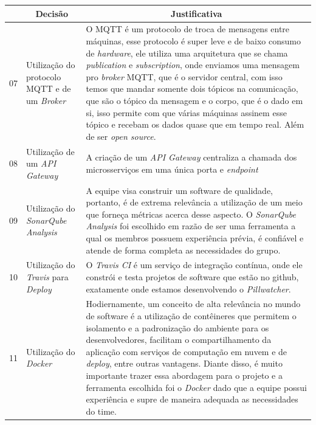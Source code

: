 \begin{apendicesenv}
\begin{table}[H]
    \centering
    \begin{adjustbox}{max width = \textwidth}
        \begin{tabular}{|c|p{5cm}|p{10cm}|}
            \hline
            \rowcolor[HTML]{A8DADC}
            \multicolumn{1}{|c}{\textbf{\#}} &
            \multicolumn{1}{|c}{\textbf{Decisão}} & \multicolumn{1}{|c|}{\textbf{Justificativa}} \\ 
            \hline
            07 & Utilização do protocolo MQTT e de um \textit{Broker} & O MQTT é um protocolo de troca de mensagens entre máquinas, esse protocolo é super leve e de baixo consumo de \textit{hardware}, ele utiliza uma arquitetura que se chama \textit{publication} e \textit{subscription}, onde enviamos uma mensagem pro \textit{broker} MQTT, que é o servidor central, com isso temos que mandar somente dois tópicos na comunicação, que são o tópico da mensagem e o corpo, que é o dado em si, isso permite com que várias máquinas assinem esse tópico e recebam os dados quase que em tempo real. Além de ser \textit{open source}. \\ \hline
            08 & Utilização de um \textit{API Gateway} & A criação de um \emph{API Gateway} centraliza a chamada dos microsserviços em uma única porta e \emph{endpoint}\\ 
            \hline
             09 & Utilização do \textit{SonarQube Analysis} & A equipe visa construir um software de qualidade, portanto, é de extrema relevância a utilização de um meio que forneça métricas acerca desse aspecto. O \textit{SonarQube Analysis} foi escolhido em razão de ser uma ferramenta a qual os membros possuem experiência prévia, é confiável e atende de forma completa as necessidades do grupo. \\ 
            \hline
            10 & Utilização do \textit{Travis} para \textit{Deploy} & O \textit{Travis CI} é um serviço de integração contínua, onde ele constrói e testa projetos de software que estão no github, exatamente onde estamos desenvolvendo o \textit{Pillwatcher}. \\ 
            \hline
            11 & Utilização do \textit{Docker} & Hodiernamente, um conceito de alta relevância no mundo de software é a utilização de contêineres que permitem o isolamento e a padronização do ambiente para os desenvolvedores, facilitam o compartilhamento da aplicação com serviços de computação em nuvem e de \textit{deploy}, entre outras vantagens. Diante disso, é muito importante trazer essa abordagem para o projeto e a ferramenta escolhida foi o \textit{Docker} dado que a equipe possui experiência e supre de maneira adequada as necessidades do time.  \\ 

\end{tabular}
\end{adjustbox}
\end{table}
\end{apendicesenv}
